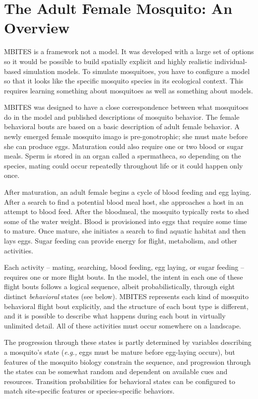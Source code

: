 \documentclass{article}
\newcommand{\eg}{{\em e.g., }}
\begin{document}
\clearpage 

\section{The Adult Female Mosquito: An Overview}

MBITES is a framework not a model. It was developed with a large set of options so it would be possible to build spatially explicit and highly realistic individual-based simulation models. To simulate mosquitoes, you have to configure a model so that it looks like the specific mosquito species in its ecological context.  This requires learning something about mosquitoes as well as something about models. 

MBITES was designed to have a close correspondence between what mosquitoes do in the model and published descriptions of mosquito behavior. The female behavioral bouts are based on a basic description of adult female behavior. A newly emerged female mosquito imago is pre-gonotrophic; she must mate before she can produce eggs. Maturation could also require one or two blood or sugar meals. Sperm is stored in an organ called a spermatheca, so depending on the species, mating could occur repeatedly throughout life or it could happen only once. 

After maturation, an adult female begins a cycle of blood feeding and egg laying. After a search to find a potential blood meal host, she approaches a host in an attempt to blood feed. After the bloodmeal, the mosquito typically rests to shed some of the water weight. Blood is provisioned into eggs that require some time to mature. Once mature, she initiates a search to find aquatic habitat and then lays eggs. Sugar feeding can provide energy for flight, metabolism, and other activities.

Each activity -- mating, searching, blood feeding, egg laying, or sugar feeding -- requires one or more flight bouts. In the model, the intent in each one of these flight bouts follows a logical sequence, albeit probabilistically, through eight distinct {\em behavioral} states (see below). MBITES represents each kind of mosquito behavioral flight bout explicitly, and the structure of each bout type is different, and it is possible to describe what happens during each bout in virtually unlimited detail. All of these activities must occur somewhere on a landscape. 

The progression through these states is partly determined by variables describing a mosquito's state (\eg eggs must be mature before egg-laying occurs), but features of the mosquito biology constrain the sequence, and progression through the states can be somewhat random and dependent on available cues and resources. Transition probabilities for behavioral states can be configured to match site-specific features or species-specific behaviors.
\end{document}

